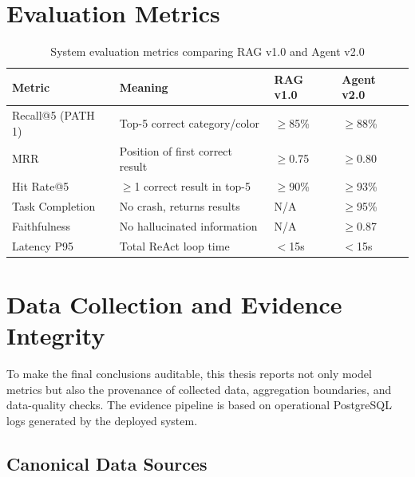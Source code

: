 
\section{Evaluation Metrics}

\begin{table}[H]
\centering
\begin{tabular}{llll}
\toprule
\textbf{Metric} & \textbf{Meaning} & \textbf{RAG v1.0} & \textbf{Agent v2.0}\\
\midrule
Recall@5 (PATH 1)   & Top-5 correct category/color   & $\geq$85\% & $\geq$88\%\\
MRR                 & Position of first correct result & $\geq$0.75 & $\geq$0.80\\
Hit Rate@5          & $\geq$1 correct result in top-5 & $\geq$90\% & $\geq$93\%\\
Task Completion     & No crash, returns results       & N/A         & $\geq$95\%\\
Faithfulness        & No hallucinated information     & N/A         & $\geq$0.87\\
Latency P95         & Total ReAct loop time           & $<$15s      & $<$15s\\
\bottomrule
\end{tabular}
\caption{System evaluation metrics comparing RAG v1.0 and Agent v2.0}
\end{table}

\section{Data Collection and Evidence Integrity}
\label{sec:data_evidence_integrity}

To make the final conclusions auditable, this thesis reports not only model metrics but also the provenance of collected data, aggregation boundaries, and data-quality checks. The evidence pipeline is based on operational PostgreSQL logs generated by the deployed system.

\subsection{Canonical Data Sources}
\label{subsec:canonical_data_sources}

